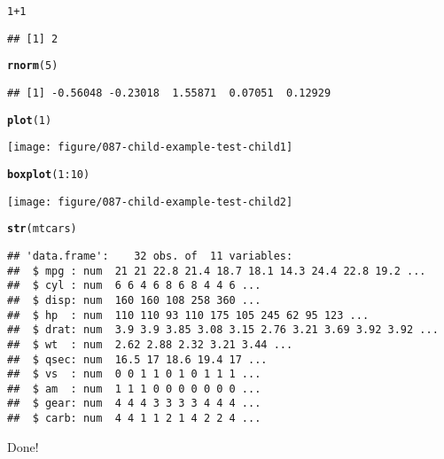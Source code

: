 \documentclass{article}\usepackage[]{graphicx}\usepackage[]{color}
\makeatletter
\newcommand{\hlnum}[1]{\textcolor[rgb]{0.686,0.059,0.569}{#1}}%
\newcommand{\hlopt}[1]{\textcolor[rgb]{0,0,0}{#1}}%
\newcommand{\hlstd}[1]{\textcolor[rgb]{0.345,0.345,0.345}{#1}}%
\newcommand{\hlkwd}[1]{\textcolor[rgb]{0.737,0.353,0.396}{\textbf{#1}}}%
\newenvironment{kframe}{%
 \def\at@end@of@kframe{}%
 \ifinner\ifhmode%
  \def\at@end@of@kframe{\end{minipage}}%
  \begin{minipage}{\columnwidth}%
 \fi\fi%
 \def\FrameCommand##1{\hskip\@totalleftmargin \hskip-\fboxsep
 \colorbox{shadecolor}{##1}\hskip-\fboxsep
     \hskip-\linewidth \hskip-\@totalleftmargin \hskip\columnwidth}%
 \MakeFramed {\advance\hsize-\width
   \@totalleftmargin\z@ \linewidth\hsize
   \@setminipage}}%
 {\par\unskip\endMakeFramed%
 \at@end@of@kframe}
\newenvironment{knitrout}{}{} %
\makeatother
\begin{document}
\begin{knitrout}
\color{fgcolor}\begin{kframe}
\begin{alltt}
\hlnum{1} \hlopt{+} \hlnum{1}
\end{alltt}
\begin{verbatim}
## [1] 2
\end{verbatim}
\begin{alltt}
\hlkwd{rnorm}\hlstd{(}\hlnum{5}\hlstd{)}
\end{alltt}
\begin{verbatim}
## [1] -0.56048 -0.23018  1.55871  0.07051  0.12929
\end{verbatim}
\begin{alltt}
\hlkwd{plot}\hlstd{(}\hlnum{1}\hlstd{)}
\end{alltt}
\end{kframe}
\texttt{[image: figure/087-child-example-test-child1]} 
\begin{kframe}\begin{alltt}
\hlkwd{boxplot}\hlstd{(}\hlnum{1}\hlopt{:}\hlnum{10}\hlstd{)}
\end{alltt}
\end{kframe}
\texttt{[image: figure/087-child-example-test-child2]} 
\begin{kframe}\begin{alltt}
\hlkwd{str}\hlstd{(mtcars)}
\end{alltt}
\begin{verbatim}
## 'data.frame':	32 obs. of  11 variables:
##  $ mpg : num  21 21 22.8 21.4 18.7 18.1 14.3 24.4 22.8 19.2 ...
##  $ cyl : num  6 6 4 6 8 6 8 4 4 6 ...
##  $ disp: num  160 160 108 258 360 ...
##  $ hp  : num  110 110 93 110 175 105 245 62 95 123 ...
##  $ drat: num  3.9 3.9 3.85 3.08 3.15 2.76 3.21 3.69 3.92 3.92 ...
##  $ wt  : num  2.62 2.88 2.32 3.21 3.44 ...
##  $ qsec: num  16.5 17 18.6 19.4 17 ...
##  $ vs  : num  0 0 1 1 0 1 0 1 1 1 ...
##  $ am  : num  1 1 1 0 0 0 0 0 0 0 ...
##  $ gear: num  4 4 4 3 3 3 3 4 4 4 ...
##  $ carb: num  4 4 1 1 2 1 4 2 2 4 ...
\end{verbatim}
\end{kframe}
\end{knitrout}



Done!
\end{document}
